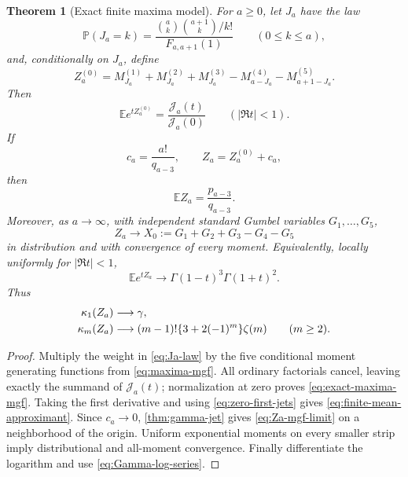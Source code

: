 \documentclass[11pt]{article}
\newtheorem{theorem}{Theorem}[section]
\theoremstyle{definition}
\theoremstyle{remark}
\newcommand{\Prob}{\mathbb P}
\begin{document}
\begin{theorem}[Exact finite maxima model]
\label{thm:ram-probability}
For \(a\ge0\), let \(J_a\) have the law
\begin{equation}\label{eq:Ja-law}
 \Prob(J_a=k)=
 \frac{\binom ak\binom{a+1}k/k!}{F_{a,a+1}(1)}
 \qquad(0\le k\le a),
\end{equation}
and, conditionally on \(J_a\), define
\begin{equation}\label{eq:Za0}
 Z_a^{(0)}=
 M_{J_a}^{(1)}+M_{J_a}^{(2)}+M_{J_a}^{(3)}
 -M_{a-J_a}^{(4)}-M_{a+1-J_a}^{(5)}.
\end{equation}
Then
\begin{equation}\label{eq:exact-maxima-mgf}
 \boxed{\displaystyle
 \mathbb Ee^{tZ_a^{(0)}}
 =\frac{\mathscr J_a(t)}{\mathscr J_a(0)}}
 \qquad(|\Re t|<1).
\end{equation}
If
\begin{equation}\label{eq:Za-correction}
 c_a=\frac{a!}{q_{a-3}},\qquad Z_a=Z_a^{(0)}+c_a,
\end{equation}
then
\begin{equation}\label{eq:finite-mean-approximant}
 \boxed{\displaystyle\mathbb EZ_a=\frac{p_{a-3}}{q_{a-3}}.}
\end{equation}
Moreover, as \(a\to\infty\), with independent standard Gumbel variables
\(G_1,\ldots,G_5\),
\begin{equation}\label{eq:Za-all-moments}
 Z_a\longrightarrow X_0:=G_1+G_2+G_3-G_4-G_5
\end{equation}
in distribution and with convergence of every moment.  Equivalently,
locally uniformly for \(|\Re t|<1\),
\begin{equation}\label{eq:Za-mgf-limit}
 \mathbb Ee^{tZ_a}\longrightarrow
 \Gamma(1-t)^3\Gamma(1+t)^2.
\end{equation}
Thus
\begin{align}
 \kappa_1(Z_a)&\longrightarrow\gamma,\notag\\
 \kappa_m(Z_a)&\longrightarrow
 (m-1)!\{3+2(-1)^m\}\zeta(m)\qquad(m\ge2).
 \label{eq:Za-cumulants}
\end{align}
\end{theorem}

\begin{proof}
Multiply the weight in \eqref{eq:Ja-law} by the five conditional moment
generating functions from \eqref{eq:maxima-mgf}.  All ordinary factorials
cancel, leaving exactly the summand of \(\mathscr J_a(t)\); normalization at
zero proves \eqref{eq:exact-maxima-mgf}.  Taking the first derivative and
using \eqref{eq:zero-first-jets} gives
\eqref{eq:finite-mean-approximant}.  Since \(c_a\to0\),
\cref{thm:gamma-jet} gives \eqref{eq:Za-mgf-limit} on a neighborhood of the
origin.  Uniform exponential moments on every smaller strip imply
distributional and all-moment convergence.  Finally differentiate the
logarithm and use \eqref{eq:Gamma-log-series}.
\end{proof}
\end{document}
